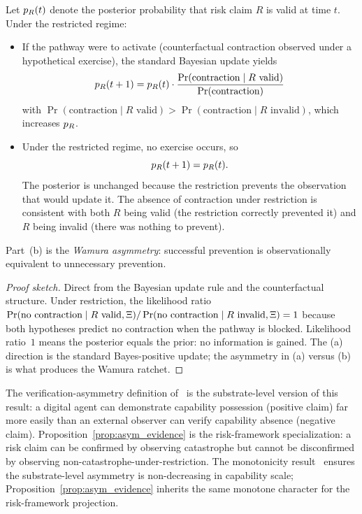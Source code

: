 \begin{proposition}
\label{prop:asym_evidence}
Let $p_R(t)$ denote the posterior probability that risk claim $R$
is valid at time $t$.  Under the restricted regime:
\begin{itemize}
\item[(a)] If the pathway were to activate (counterfactual
  contraction observed under a hypothetical exercise), the
  standard Bayesian update yields
  $$p_R(t+1) = p_R(t) \cdot
     \frac{\Pr(\text{contraction} \mid R \text{ valid})}
          {\Pr(\text{contraction})}$$
  with
  $\Pr(\text{contraction} \mid R \text{ valid})
     > \Pr(\text{contraction} \mid R \text{ invalid})$,
  which increases $p_R$.
\item[(b)] Under the restricted regime, no exercise occurs, so
  $$p_R(t+1) = p_R(t).$$
  The posterior is unchanged because the restriction prevents
  the observation that would update it.  The absence of
  contraction under restriction is consistent with both $R$
  being valid (the restriction correctly prevented it) and $R$
  being invalid (there was nothing to prevent).
\end{itemize}
Part~(b) is the \emph{Wamura asymmetry}: successful prevention is
observationally equivalent to unnecessary prevention.
\end{proposition}

\begin{proof}[Proof sketch]
Direct from the Bayesian update rule and the counterfactual
structure.  Under restriction, the likelihood ratio
$\Pr(\text{no contraction} \mid R \text{ valid}, \Xi)
 / \Pr(\text{no contraction} \mid R \text{ invalid}, \Xi)
 = 1$
because both hypotheses predict no contraction when the pathway
is blocked.  Likelihood ratio~$1$ means the posterior equals the
prior: no information is gained.  The (a) direction is the
standard Bayes-positive update; the asymmetry in (a) versus (b)
is what produces the Wamura ratchet.
\end{proof}

\begin{remark}
\label{rem:substrate_asym}
The verification-asymmetry definition
of~\citep[Definition~2]{lasser2026exo} is the substrate-level
version of this result: a digital agent can demonstrate
capability possession (positive claim) far more easily than an
external observer can verify capability absence (negative claim).
Proposition~\ref{prop:asym_evidence} is the risk-framework
specialization: a risk claim can be confirmed by observing
catastrophe but cannot be disconfirmed by observing
non-catastrophe-under-restriction.  The monotonicity
result~\citep[Proposition~1]{lasser2026exo} ensures the
substrate-level asymmetry is non-decreasing in capability scale;
Proposition~\ref{prop:asym_evidence} inherits the same monotone
character for the risk-framework projection.
\end{remark}

